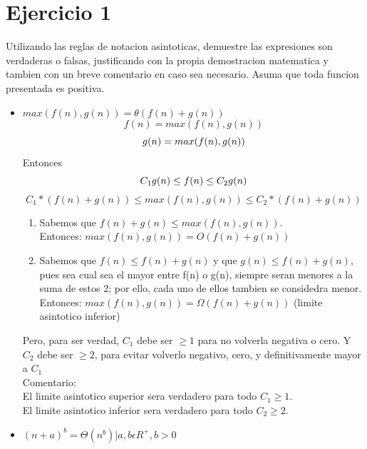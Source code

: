 \documentclass[10pt,a4paper]{article}
\begin{document}
\section{Ejercicio 1}
	Utilizando las reglas de notacion asintoticas, demuestre las expresiones son verdaderas o falsas, justificando con la propia demostracion matematica y tambien con un breve comentario en caso sea necesario. Asuma que toda funcion presentada es positiva.
	\begin{itemize}
		\item 
			$max(f(n),g(n))=\theta(f(n)+g(n))$ \\
			\begin{equation*}
				 f(n) = max(f(n),g(n)) 
			\end{equation*}
			\begin{equation*}
				 g(n) = max(f(n),g(n))\\
			\end{equation*}
			Entonces
			\begin{equation*}
					C_{1}g(n) \leq  f(n) \leq C_{2}g(n)\\
			\end{equation*}
			\begin{equation*}
				C_{1}*(f(n)+g(n)) \leq  max(f(n),g(n)) \leq C_{2}*(f(n)+g(n)) 
			\end{equation*}
			\begin{enumerate}
				\item Sabemos que $f(n) + g(n) \leq max(f(n),g(n))$. \\Entonces: $max(f(n),g(n)) = O(f(n)+g(n))$
				\item Sabemos que $f(n) \leq f(n)+ g(n)$ y que $g(n) \leq f(n)+ g(n)$, pues sea cual sea el mayor entre f(n) o g(n), siempre seran menores a la suma de estos 2; por ello, cada uno de ellos tambien se considedra menor. \\Entonces: $max(f(n),g(n)) = \Omega (f(n)+g(n))$ (limite asintotico inferior)
			\end{enumerate}
			Pero, para ser verdad, $C_{1}$ debe ser $\geq  1$ para no volverla negativa o cero. Y $C_{2}$ debe ser $\geq  2$, para evitar volverlo negativo, cero, y definitivamente mayor a $C_{1}$\\
			Comentario:\\ El limite asintotico superior sera verdadero para todo $C_{1}\geq  1$.\\El limite asintotico inferior sera verdadero para todo $C_{2}\geq  2$.
		\item 
			$(n + a)^{b} = \Theta (n^{b}) | a, b \epsilon R^{+}, b > 0$

\end{itemize}
\end{document}
